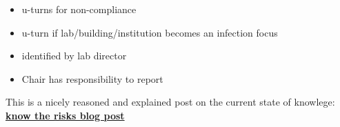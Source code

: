 \documentclass[onecolumn]{article}
\begin{document}
\begin{enumerate}
  \begin{itemize}
  \item
    u-turns for non-compliance
  \item
    u-turn if lab/building/institution becomes an infection focus
  \item
    identified by lab director
  \item
    Chair has responsibility to report
  \end{itemize}
\end{enumerate}

This is a nicely reasoned and explained post on the current state of
knowlege:
\textbf{\href{https://www.erinbromage.com/post/the-risks-know-them-avoid-them?fbclid=IwAR0Ph8Qq8sXUJyGYZhPb_J2WV6_eURP7rYbs44-LOYdMfNMWtwTXoJqi2EE}{know
the risks blog post}}
\end{document}
